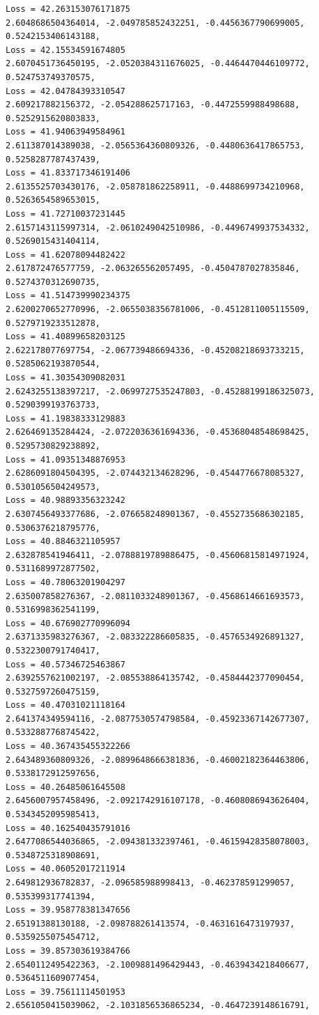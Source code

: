 \documentclass[11pt]{article}
\begin{document}
\begin{Verbatim}[commandchars=\\\{\}]
Loss = 42.263153076171875
2.6048686504364014, -2.049785852432251, -0.4456367790699005, 0.5242153406143188,
Loss = 42.15534591674805
2.6070451736450195, -2.0520384311676025, -0.4464470446109772, 0.524753749370575,
Loss = 42.04784393310547
2.609217882156372, -2.054288625717163, -0.4472559988498688, 0.5252915620803833,
Loss = 41.94063949584961
2.611387014389038, -2.0565364360809326, -0.4480636417865753, 0.5258287787437439,
Loss = 41.833717346191406
2.6135525703430176, -2.058781862258911, -0.4488699734210968, 0.5263654589653015,
Loss = 41.72710037231445
2.6157143115997314, -2.0610249042510986, -0.4496749937534332,
0.5269015431404114,
Loss = 41.62078094482422
2.617872476577759, -2.063265562057495, -0.4504787027835846, 0.5274370312690735,
Loss = 41.514739990234375
2.6200270652770996, -2.0655038356781006, -0.4512811005115509,
0.5279719233512878,
Loss = 41.40899658203125
2.622178077697754, -2.067739486694336, -0.45208218693733215, 0.5285062193870544,
Loss = 41.30354309082031
2.6243255138397217, -2.0699727535247803, -0.45288199186325073,
0.5290399193763733,
Loss = 41.19838333129883
2.626469135284424, -2.0722036361694336, -0.45368048548698425,
0.5295730829238892,
Loss = 41.09351348876953
2.6286091804504395, -2.074432134628296, -0.4544776678085327, 0.5301056504249573,
Loss = 40.98893356323242
2.6307456493377686, -2.076658248901367, -0.4552735686302185, 0.5306376218795776,
Loss = 40.8846321105957
2.632878541946411, -2.0788819789886475, -0.45606815814971924,
0.5311689972877502,
Loss = 40.78063201904297
2.635007858276367, -2.0811033248901367, -0.4568614661693573, 0.5316998362541199,
Loss = 40.676902770996094
2.6371335983276367, -2.083322286605835, -0.4576534926891327, 0.5322300791740417,
Loss = 40.57346725463867
2.6392557621002197, -2.085538864135742, -0.4584442377090454, 0.5327597260475159,
Loss = 40.47031021118164
2.641374349594116, -2.0877530574798584, -0.45923367142677307,
0.5332887768745422,
Loss = 40.367435455322266
2.643489360809326, -2.0899648666381836, -0.46002182364463806,
0.5338172912597656,
Loss = 40.26485061645508
2.6456007957458496, -2.0921742916107178, -0.4608086943626404,
0.5343452095985413,
Loss = 40.162540435791016
2.6477086544036865, -2.094381332397461, -0.46159428358078003,
0.5348725318908691,
Loss = 40.06052017211914
2.649812936782837, -2.096585988998413, -0.462378591299057, 0.535399317741394,
Loss = 39.958778381347656
2.65191388130188, -2.098788261413574, -0.4631616473197937, 0.5359255075454712,
Loss = 39.857303619384766
2.6540112495422363, -2.1009881496429443, -0.4639434218406677,
0.5364511609077454,
Loss = 39.75611114501953
2.6561050415039062, -2.1031856536865234, -0.4647239148616791,

\end{Verbatim}
\end{document}

